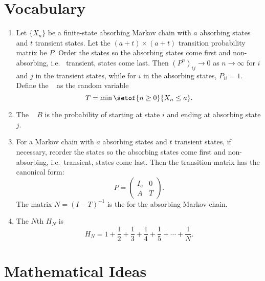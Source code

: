 \documentclass[12pt]{article}
\begin{document}
\section*{Vocabulary}
\begin{enumerate}
    \item
        Let \( \{ X_n \} \) be a finite-state absorbing Markov chain
        with \( a \) absorbing states and \( t \) transient states.  Let
        the \( (a + t) \times (a + t) \) transition probability matrix
        be \( P \).  Order the states so the absorbing states come first
        and non-absorbing, i.e.\ %
        transient, states come last.  Then \( \left(P^n \right)_{ij} \to 0 \) as \(
        n \to \infty \) for \( i \) and \( j \) in the transient states,
        while for \( i \) in the absorbing states, \( P_{ii} = 1 \).
        Define the ~%
        as the random variable
        \[
            T = \min \setof{n \ge 0}{X_n \le a}.
        \]
    \item
        The ~%
        \( B \) is the probability of starting at state \( i \) and
        ending at absorbing state \( j \).
    \item
        For a Markov chain with \( a \) absorbing states and \( t \)
        transient states, if necessary, reorder the states so the
        absorbing states come first and non-absorbing, i.e.\ transient,
        states come last.  Then the transition matrix has the canonical
        form:
        \[
            P =
            \begin{pmatrix}
                I_a & 0 \\
                A & T
            \end{pmatrix}
            .
        \] The matrix \( N = (I-T)^{-1} \) is the %
        for the absorbing Markov chain.
    \item
        The \( N \)th  \( H_N \) is%
        \[
            H_N = 1 + \frac{1}{2} + \frac{1}{3} + \frac{1}{4} + \frac{1}
            {5} + \cdots + \frac{1}{N}.
        \]
\end{enumerate}

\hr

\section*{Mathematical Ideas}
\end{document}
